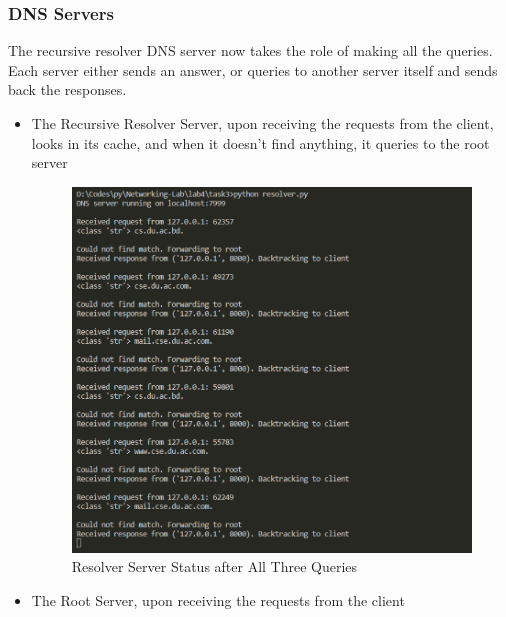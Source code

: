 \documentclass[11pt]{article}
\begin{document}
        \subsubsection*{DNS Servers}
        The recursive resolver DNS server now takes the role of making all the queries. Each server either sends an answer, or queries to another
        server itself and sends back the responses.
            \begin{itemize}
                \item The Recursive Resolver Server, upon receiving the requests from the client, looks in its cache, and when it doesn't find anything,
                it queries to the root server
                
                    \begin{figure}[!h]
                        \centering
                        \includegraphics*[width=\textwidth]{task3_server_resolver.png}
                        \caption{Resolver Server Status after All Three Queries}
                    \end{figure}
                \FloatBarrier
                \item The Root Server, upon receiving the requests from the client
                

\end{itemize}
\end{document}
